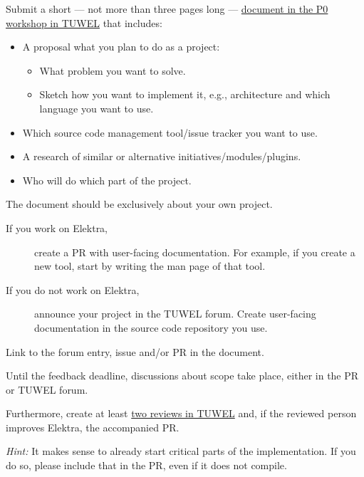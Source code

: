 \documentclass[11pt,a4paper]{article}
\begin{document}
Submit a short --- not more than three pages long --- \href{https://tuwel.tuwien.ac.at/mod/workshop/view.php?id=1661170}{document in the P0 workshop in TUWEL} that includes:

\begin{itemize}
\item A proposal what you plan to do as a project:
\begin{itemize}
\item What problem you want to solve.
\item Sketch how you want to implement it, e.g., architecture and which language you want to use.
\end{itemize}
\item Which source code management tool/issue tracker you want to use.
\item A research of similar or alternative initiatives/modules/plugins.
\item Who will do which part of the project.
\end{itemize}

The document should be exclusively about your own project.

\begin{description}
\item[If you work on Elektra,] create a PR with user-facing documentation.
For example, if you create a new tool, start by writing the man page of that tool.

\item[If you do not work on Elektra,] announce your project in the TUWEL forum.
Create user-facing documentation in the source code repository you use.
\end{description}

Link to the forum entry, issue and/or PR in the document.

Until the feedback deadline, discussions about scope take place, either in the PR or TUWEL forum.

Furthermore, create at least \href{https://tuwel.tuwien.ac.at/mod/workshop/view.php?id=1661170}{two reviews in TUWEL} and, if the reviewed person improves Elektra, the accompanied PR.

\textit{Hint:}
It makes sense to already start critical parts of the implementation.
If you do so, please include that in the PR, even if it does not compile.



\newpage

\renewcommand{\thesection}{P1 Midterm}
\end{document}
